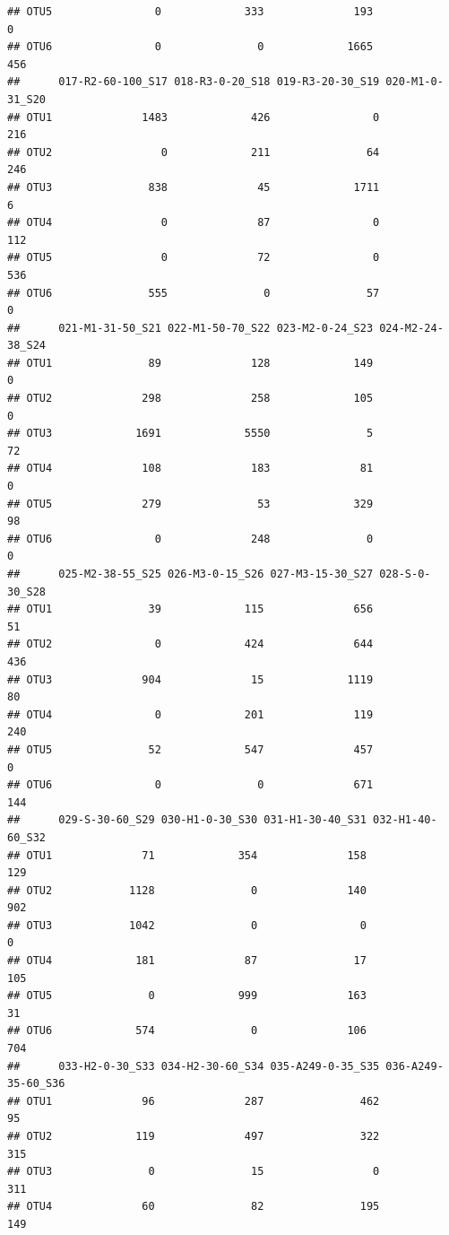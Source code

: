 \documentclass[]{article}
\begin{document}
\begin{verbatim}
## OTU5                0             333              193                0
## OTU6                0               0             1665              456
##      017-R2-60-100_S17 018-R3-0-20_S18 019-R3-20-30_S19 020-M1-0-31_S20
## OTU1              1483             426                0             216
## OTU2                 0             211               64             246
## OTU3               838              45             1711               6
## OTU4                 0              87                0             112
## OTU5                 0              72                0             536
## OTU6               555               0               57               0
##      021-M1-31-50_S21 022-M1-50-70_S22 023-M2-0-24_S23 024-M2-24-38_S24
## OTU1               89              128             149                0
## OTU2              298              258             105                0
## OTU3             1691             5550               5               72
## OTU4              108              183              81                0
## OTU5              279               53             329               98
## OTU6                0              248               0                0
##      025-M2-38-55_S25 026-M3-0-15_S26 027-M3-15-30_S27 028-S-0-30_S28
## OTU1               39             115              656             51
## OTU2                0             424              644            436
## OTU3              904              15             1119             80
## OTU4                0             201              119            240
## OTU5               52             547              457              0
## OTU6                0               0              671            144
##      029-S-30-60_S29 030-H1-0-30_S30 031-H1-30-40_S31 032-H1-40-60_S32
## OTU1              71             354              158              129
## OTU2            1128               0              140              902
## OTU3            1042               0                0                0
## OTU4             181              87               17              105
## OTU5               0             999              163               31
## OTU6             574               0              106              704
##      033-H2-0-30_S33 034-H2-30-60_S34 035-A249-0-35_S35 036-A249-35-60_S36
## OTU1              96              287               462                 95
## OTU2             119              497               322                315
## OTU3               0               15                 0                311
## OTU4              60               82               195                149

\end{verbatim}
\end{document}
